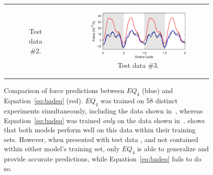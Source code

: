 \documentclass[fleqn,10pt]{wlscirep}
\begin{document}
\begin{figure}[ht]
\begin{tabular}{cc}
\begin{subfigure}{0.48\textwidth}
\caption{\label{fig:eq_goodbad_3} Test data \#2.}
\end{subfigure} &
\begin{subfigure}{0.48\textwidth}
\centering
\includegraphics[width=\textwidth]{figures/eq_goodbad_4}
\caption{\label{fig:eq_goodbad_4} Test data \#3.}
\end{subfigure}
\end{tabular}
\caption{Comparison of force predictions between $EQ_4$ (blue) and
Equation~\eqref{eq:badeq} (red). $EQ_4$ was trained on 58 distinct experiments
simultaneously, including the data shown in~, whereas
Equation~\eqref{eq:badeq} was trained \emph{only} on the data shown
in~.   shows that both models
perform well on this data within their training sets.  However, when presented
with test data ,  and
 not contained within either model's training set, only $EQ_4$ is able to
generalize and provide accurate predictions, while Equation~\eqref{eq:badeq}
fails to do so.}
\label{fig:eq_goodbad}
\end{figure}
\end{document}
